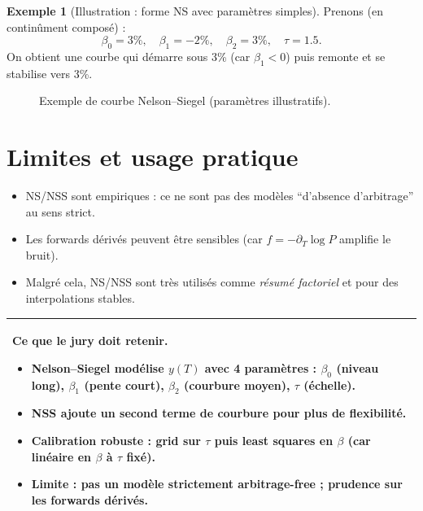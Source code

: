 \documentclass[11pt,a4paper]{report}
\newcommand{\1}{\mathbbm{1}}
\theoremstyle{definition}
\newtheorem{example}{Exemple}[chapter]
\theoremstyle{plain}
\theoremstyle{remark}
\newenvironment{jurybox}{%
  \begin{center}
  \setlength{\tabcolsep}{6pt}%
  \renewcommand{\arraystretch}{1.1}%
  \begin{tabular}{|p{0.94\textwidth}|}
  \hline
  \small\textbf{Ce que le jury doit retenir.}\par\medskip
}{%
  \\ \hline
  \end{tabular}
  \end{center}
}
\begin{document}
\begin{example}[Illustration : forme NS avec paramètres simples]
Prenons (en continûment composé) :
\[
\beta_0=3\%,\quad \beta_1=-2\%,\quad \beta_2=3\%,\quad \tau=1.5.
\]
On obtient une courbe qui démarre sous 3\% (car $\beta_1<0$) puis remonte et se stabilise vers 3\%.
\end{example}

\begin{figure}[h!]
\centering
{}
\caption{Exemple de courbe Nelson--Siegel (paramètres illustratifs).}
\label{fig:ns_example}
\end{figure}

\section{Limites et usage pratique}
\begin{itemize}
  \item NS/NSS sont empiriques : ce ne sont pas des modèles ``d'absence d'arbitrage'' au sens strict.
  \item Les forwards dérivés peuvent être sensibles (car $f=-\partial_T \log P$ amplifie le bruit).
  \item Malgré cela, NS/NSS sont très utilisés comme \emph{résumé factoriel} et pour des interpolations stables.
\end{itemize}

\begin{jurybox}
\begin{itemize}
\item Nelson--Siegel modélise $y(T)$ avec 4 paramètres : $\beta_0$ (niveau long), $\beta_1$ (pente court), $\beta_2$ (courbure moyen), $\tau$ (échelle).
\item NSS ajoute un second terme de courbure pour plus de flexibilité.
\item Calibration robuste : grid sur $\tau$ puis least squares en $\beta$ (car linéaire en $\beta$ à $\tau$ fixé).
\item Limite : pas un modèle strictement arbitrage-free ; prudence sur les forwards dérivés.
\end{itemize}
\end{jurybox}
\end{document}
